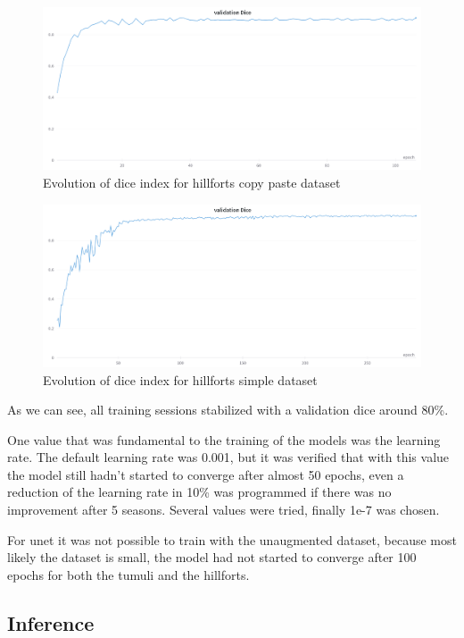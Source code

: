\begin{figure}[H]
\centering
\includegraphics[width=12cm]{images/unet/castros_copy.png}
\caption{Evolution of dice index for hillforts copy paste dataset}
\end{figure}

\begin{figure}[H]
\centering
\includegraphics[width=12cm]{images/unet/castros_simple.png}
\caption{Evolution of dice index for hillforts simple dataset}
\end{figure}

As we can see, all training sessions stabilized with a validation dice around 80\%.

One value that was fundamental to the training of the models was the learning rate. The default learning rate was 0.001, but it was verified that with this value the model still hadn't started to converge after almost 50 epochs, even a reduction of the learning rate in 10\% was programmed if there was no improvement after 5 seasons. Several values were tried, finally 1e-7 was chosen.

For unet it was not possible to train with the unaugmented dataset, because most likely the dataset is small, the model had not started to converge after 100 epochs for both the tumuli and the hillforts.


\subsection{Inference}

